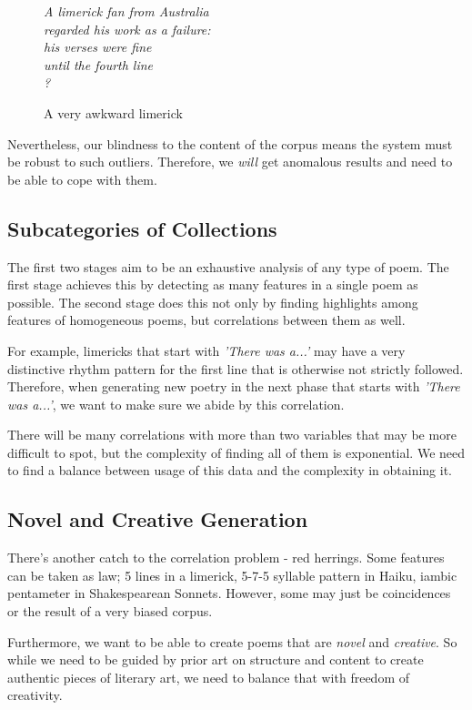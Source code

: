 \begin{figure}[h!]
\centering
\textit{
A limerick fan from Australia\\
regarded his work as a failure:\\
his verses were fine\\
until the fourth line\\
?
}
\caption{A very awkward limerick}
\label{fig:awkward-limerick}
\end{figure}
Nevertheless, our blindness to the content of the corpus means the system must be robust to such outliers. Therefore, we \textit{will} get anomalous results and need to be able to cope with them.

\subsection{Subcategories of Collections}

The first two stages aim to be an exhaustive analysis of any type of poem. The first stage achieves this by detecting as many features in a single poem as possible. The second stage does this not only by finding highlights among features of homogeneous poems, but correlations between them as well.

For example, limericks that start with \textit{'There was a...'} may have a very distinctive rhythm pattern for the first line that is otherwise not strictly followed. Therefore, when generating new poetry in the next phase that starts with \textit{'There was a...'}, we want to make sure we abide by this correlation.

There will be many correlations with more than two variables that may be more difficult to spot, but the complexity of finding all of them is exponential. We need to find a balance between usage of this data and the complexity in obtaining it.

\subsection{Novel and Creative Generation}

There's another catch to the correlation problem - red herrings. Some features can be taken as law; 5 lines in a limerick, 5-7-5 syllable pattern in Haiku, iambic pentameter in Shakespearean Sonnets. However, some may just be coincidences or the result of a very biased corpus.

Furthermore, we want to be able to create poems that are \textit{novel} and \textit{creative}. So while we need to be guided by prior art on structure and content to create authentic pieces of literary art, we need to balance that with freedom of creativity. 

